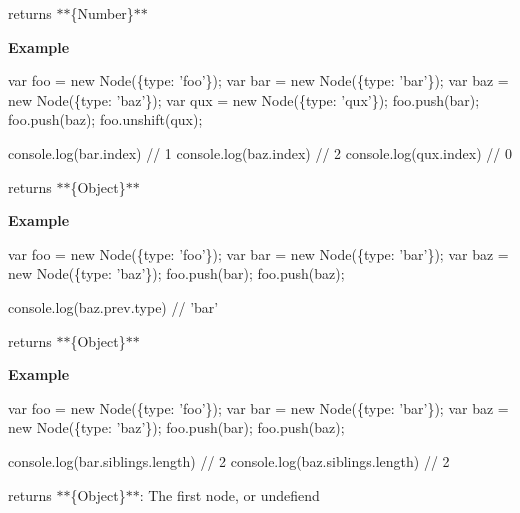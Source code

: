 \begin{DoxyItemize}
\item {\ttfamily returns} $\ast$$\ast$\{Number\}$\ast$$\ast$
\end{DoxyItemize}

{\bfseries Example}


\begin{DoxyCode}
var foo = new Node(\{type: 'foo'\});
var bar = new Node(\{type: 'bar'\});
var baz = new Node(\{type: 'baz'\});
var qux = new Node(\{type: 'qux'\});
foo.push(bar);
foo.push(baz);
foo.unshift(qux);

console.log(bar.index) // 1
console.log(baz.index) // 2
console.log(qux.index) // 0
\end{DoxyCode}



\begin{DoxyItemize}
\item {\ttfamily returns} $\ast$$\ast$\{Object\}$\ast$$\ast$
\end{DoxyItemize}

{\bfseries Example}


\begin{DoxyCode}
var foo = new Node(\{type: 'foo'\});
var bar = new Node(\{type: 'bar'\});
var baz = new Node(\{type: 'baz'\});
foo.push(bar);
foo.push(baz);

console.log(baz.prev.type) // 'bar'
\end{DoxyCode}



\begin{DoxyItemize}
\item {\ttfamily returns} $\ast$$\ast$\{Object\}$\ast$$\ast$
\end{DoxyItemize}

{\bfseries Example}


\begin{DoxyCode}
var foo = new Node(\{type: 'foo'\});
var bar = new Node(\{type: 'bar'\});
var baz = new Node(\{type: 'baz'\});
foo.push(bar);
foo.push(baz);

console.log(bar.siblings.length) // 2
console.log(baz.siblings.length) // 2
\end{DoxyCode}



\begin{DoxyItemize}
\item {\ttfamily returns} $\ast$$\ast$\{Object\}$\ast$$\ast$\+: The first node, or undefiend
\end{DoxyItemize}

